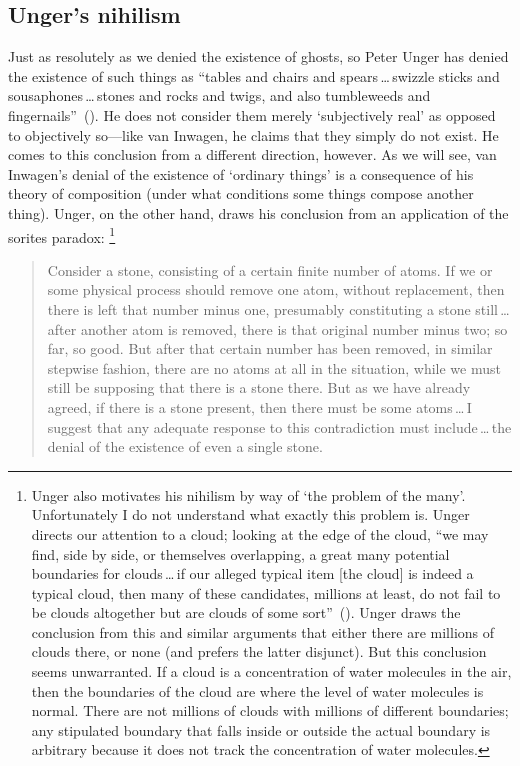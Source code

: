 \documentclass[11pt]{article}
\newenvironment{squote}{\begin{quote}\begin{singlespace}}{\end{singlespace}\end{quote}}
\begin{document}
\begin{spacing}{1.5}
\subsection{Unger's nihilism}
\label{unger}
Just as resolutely as we denied the existence of ghosts, so Peter Unger has denied the existence of such things as ``tables and chairs and spears\,\ldots\,swizzle sticks and sousaphones\,\ldots\,stones and rocks and twigs, and also tumbleweeds and fingernails''~(\citeyear[117]{unger1979}). He does not consider them merely `subjectively real' as opposed to objectively so---like van Inwagen, he claims that they simply do not exist. He comes to this conclusion from a different direction, however. As we will see, van Inwagen's denial of the existence of `ordinary things' is a consequence of his theory of composition (under what conditions some things compose another thing). Unger, on the other hand, draws his conclusion from an application of the sorites paradox:%
%
\footnote{Unger also motivates his nihilism by way of `the problem of the many'. Unfortunately I do not understand what exactly this problem is. Unger directs our attention to a cloud; looking at the edge of the cloud, ``we may find, side by side, or themselves overlapping, a great many potential boundaries for clouds\,\ldots\,if our alleged typical item [the cloud] is indeed a typical cloud, then many of these candidates, millions at least, do not fail to be clouds altogether but are clouds of some sort''~(\citeyear[420--421]{unger1980a}). Unger draws the conclusion from this and similar arguments that either there are millions of clouds there, or none (and prefers the latter disjunct). But this conclusion seems unwarranted. If a cloud is a concentration of water molecules in the air, then the boundaries of the cloud are where the level of water molecules is normal. There are not millions of clouds with millions of different boundaries; any stipulated boundary that falls inside or outside the actual boundary is arbitrary because it does not track the concentration of water molecules.}
%
\begin{squote}
Consider a stone, consisting of a certain finite number of atoms. If we or some physical process should remove one atom, without replacement, then there is left that number minus one, presumably constituting a stone still\,\ldots\,after another atom is removed, there is that original number minus two; so far, so good. But after that certain number has been removed, in similar stepwise fashion, there are no atoms at all in the situation, while we must still be supposing that there is a stone there. But as we have already agreed, if there is a stone present, then there must
be some atoms\,\ldots\,I suggest that any adequate response to this contradiction must include\,\ldots\,the denial of the existence of even a single stone.~\citep[121--122]{unger1979}
\end{squote}


\end{spacing}
\end{document}
